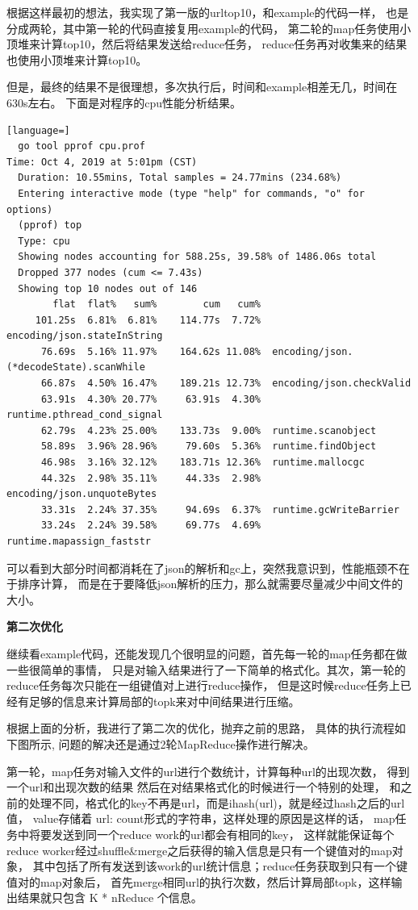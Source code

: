 \documentclass[UTF8]{ctexart}
\begin{document}
根据这样最初的想法，我实现了第一版的urltop10，和example的代码一样，
也是分成两轮，其中第一轮的代码直接复用example的代码，
第二轮的map任务使用小顶堆来计算top10，然后将结果发送给reduce任务，
reduce任务再对收集来的结果也使用小顶堆来计算top10。

但是，最终的结果不是很理想，多次执行后，时间和example相差无几，时间在630s左右。
下面是对程序的cpu性能分析结果。
\begin{lstlisting}[language=]
  go tool pprof cpu.prof                                                                                                      Time: Oct 4, 2019 at 5:01pm (CST)
  Duration: 10.55mins, Total samples = 24.77mins (234.68%)
  Entering interactive mode (type "help" for commands, "o" for options)
  (pprof) top
  Type: cpu
  Showing nodes accounting for 588.25s, 39.58% of 1486.06s total
  Dropped 377 nodes (cum <= 7.43s)
  Showing top 10 nodes out of 146
        flat  flat%   sum%        cum   cum%
     101.25s  6.81%  6.81%    114.77s  7.72%  encoding/json.stateInString
      76.69s  5.16% 11.97%    164.62s 11.08%  encoding/json.(*decodeState).scanWhile
      66.87s  4.50% 16.47%    189.21s 12.73%  encoding/json.checkValid
      63.91s  4.30% 20.77%     63.91s  4.30%  runtime.pthread_cond_signal
      62.79s  4.23% 25.00%    133.73s  9.00%  runtime.scanobject
      58.89s  3.96% 28.96%     79.60s  5.36%  runtime.findObject
      46.98s  3.16% 32.12%    183.71s 12.36%  runtime.mallocgc
      44.32s  2.98% 35.11%     44.33s  2.98%  encoding/json.unquoteBytes
      33.31s  2.24% 37.35%     94.69s  6.37%  runtime.gcWriteBarrier
      33.24s  2.24% 39.58%     69.77s  4.69%  runtime.mapassign_faststr
\end{lstlisting}

可以看到大部分时间都消耗在了json的解析和gc上，突然我意识到，性能瓶颈不在于排序计算，
而是在于要降低json解析的压力，那么就需要尽量减少中间文件的大小。

\textbf{第二次优化}

继续看example代码，还能发现几个很明显的问题，首先每一轮的map任务都在做一些很简单的事情，
只是对输入结果进行了一下简单的格式化。其次，第一轮的reduce任务每次只能在一组键值对上进行reduce操作，
但是这时候reduce任务上已经有足够的信息来计算局部的topk来对中间结果进行压缩。

根据上面的分析，我进行了第二次的优化，抛弃之前的思路，
具体的执行流程如下图所示, 问题的解决还是通过2轮MapReduce操作进行解决。

第一轮，map任务对输入文件的url进行个数统计，计算每种url的出现次数，
得到一个url和出现次数的结果 然后在对结果格式化的时候进行一个特别的处理，
和之前的处理不同，格式化的key不再是url，而是ihash(url)，就是经过hash之后的url值， 
value存储着 url: count形式的字符串，这样处理的原因是这样的话，
map任务中将要发送到同一个reduce work的url都会有相同的key，
这样就能保证每个reduce worker经过shuffle\&merge之后获得的输入信息是只有一个键值对的map对象，
其中包括了所有发送到该work的url统计信息；reduce任务获取到只有一个键值对的map对象后，
首先merge相同url的执行次数，然后计算局部topk，这样输出结果就只包含 K * nReduce 个信息。
\end{document}
